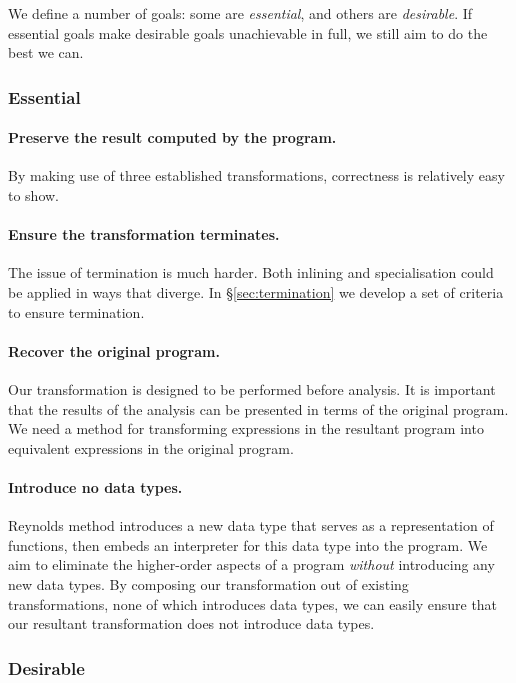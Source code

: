 \documentclass[preprint]{sigplanconf}
\begin{document}
We define a number of goals: some are \textit{essential}, and others are \textit{desirable}. If essential goals make desirable goals unachievable in full, we still aim to do the best we can.

\subsubsection*{Essential}

\paragraph{Preserve the result computed by the program.} By making use of three established transformations, correctness is relatively easy to show.

\paragraph{Ensure the transformation terminates.} The issue of termination is much harder. Both inlining and specialisation could be applied in ways that diverge. In \S\ref{sec:termination} we develop a set of criteria to ensure termination.

\paragraph{Recover the original program.} Our transformation is designed to be performed before analysis. It is important that the results of the analysis can be presented in terms of the original program. We need a method for transforming expressions in the resultant program into equivalent expressions in the original program.

\paragraph{Introduce no data types.} Reynolds method introduces a new data type that serves as a representation of functions, then embeds an interpreter for this data type into the program. We aim to eliminate the higher-order aspects of a program \textit{without} introducing any new data types. By composing our transformation out of existing transformations, none of which introduces data types, we can easily ensure that our resultant transformation does not introduce data types.


\subsubsection*{Desirable}
\end{document}
